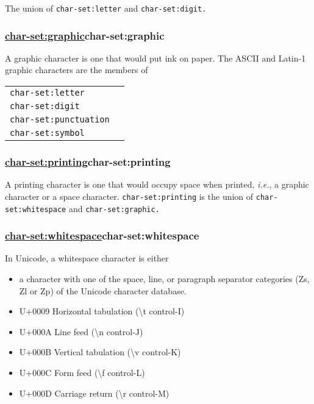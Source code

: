 The union of \texttt{char-set:letter} and \texttt{char-set:digit.}

\subsubsection{{\href{}{char-set:graphic}}{char-set:graphic}}\label{char-setgraphic}

A graphic character is one that would put ink on paper. The ASCII and
Latin-1 graphic characters are the members of

\begin{tabular}{ll}
\texttt{char-set:letter}\tabularnewline
\texttt{char-set:digit}\tabularnewline
\texttt{char-set:punctuation}\tabularnewline
\texttt{char-set:symbol}\tabularnewline
\end{tabular}

\subsubsection{{\href{}{char-set:printing}}{char-set:printing}}\label{char-setprinting}

A printing character is one that would occupy space when printed,
\emph{i.e.}, a graphic character or a space character.
\texttt{char-set:printing} is the union of \texttt{char-set:whitespace}
and \texttt{char-set:graphic.}

\subsubsection{{\href{}{char-set:whitespace}}{char-set:whitespace}}\label{char-setwhitespace}

In Unicode, a whitespace character is either

\begin{itemize}
\tightlist
\item
  a character with one of the space, line, or paragraph separator
  categories (Zs, Zl or Zp) of the Unicode character database.
\item
  U+0009 Horizontal tabulation (\textbackslash{}t control-I)
\item
  U+000A Line feed (\textbackslash{}n control-J)
\item
  U+000B Vertical tabulation (\textbackslash{}v control-K)
\item
  U+000C Form feed (\textbackslash{}f control-L)
\item
  U+000D Carriage return (\textbackslash{}r control-M)
\end{itemize}

